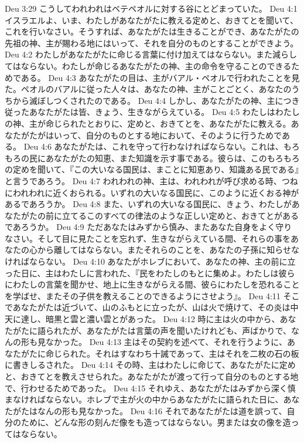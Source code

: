 Deu 3:29  こうしてわれわれはベテペオルに対する谷にとどまっていた。
Deu 4:1  イスラエルよ、いま、わたしがあなたがたに教える定めと、おきてとを聞いて、これを行いなさい。そうすれば、あなたがたは生きることができ、あなたがたの先祖の神、主が賜わる地にはいって、それを自分のものとすることができよう。
Deu 4:2  わたしがあなたがたに命じる言葉に付け加えてはならない。また減らしてはならない。わたしが命じるあなたがたの神、主の命令を守ることのできるためである。
Deu 4:3  あなたがたの目は、主がバアル・ペオルで行われたことを見た。ペオルのバアルに従った人々は、あなたの神、主がことごとく、あなたのうちから滅ぼしつくされたのである。
Deu 4:4  しかし、あなたがたの神、主につき従ったあなたがたは皆、きょう、生きながらえている。
Deu 4:5  わたしはわたしの神、主が命じられたとおりに、定めと、おきてとを、あなたがたに教える。あなたがたがはいって、自分のものとする地において、そのように行うためである。
Deu 4:6  あなたがたは、これを守って行わなければならない。これは、もろもろの民にあなたがたの知恵、また知識を示す事である。彼らは、このもろもろの定めを聞いて、『この大いなる国民は、まことに知恵あり、知識ある民である』と言うであろう。
Deu 4:7  われわれの神、主は、われわれが呼び求める時、つねにわれわれに近くおられる。いずれの大いなる国民に、このように近くおる神があるであろうか。
Deu 4:8  また、いずれの大いなる国民に、きょう、わたしがあなたがたの前に立てるこのすべての律法のような正しい定めと、おきてとがあるであろうか。
Deu 4:9  ただあなたはみずから慎み、またあなた自身をよく守りなさい。そして目に見たことを忘れず、生きながらえている間、それらの事をあなたの心から離してはならない。またそれらのことを、あなたの子孫に知らせなければならない。
Deu 4:10  あなたがホレブにおいて、あなたの神、主の前に立った日に、主はわたしに言われた、『民をわたしのもとに集めよ。わたしは彼らにわたしの言葉を聞かせ、地上に生きながらえる間、彼らにわたしを恐れることを学ばせ、またその子供を教えることのできるようにさせよう』。
Deu 4:11  そこであなたがたは近づいて、山のふもとに立ったが、山は火で焼けて、その炎は中天に達し、暗黒と雲と濃い雲とがあった。
Deu 4:12  時に主は火の中から、あなたがたに語られたが、あなたがたは言葉の声を聞いたけれども、声ばかりで、なんの形も見なかった。
Deu 4:13  主はその契約を述べて、それを行うように、あなたがたに命じられた。それはすなわち十誡であって、主はそれを二枚の石の板に書きしるされた。
Deu 4:14  その時、主はわたしに命じて、あなたがたに定めと、おきてとを教えさせられた。あなたがたが渡って行って自分のものとする地で、行わせるためであった。
Deu 4:15  それゆえ、あなたがたはみずから深く慎まなければならない。ホレブで主が火の中からあなたがたに語られた日に、あなたがたはなんの形も見なかった。
Deu 4:16  それであなたがたは道を誤って、自分のために、どんな形の刻んだ像をも造ってはならない。男または女の像を造ってはならない。
